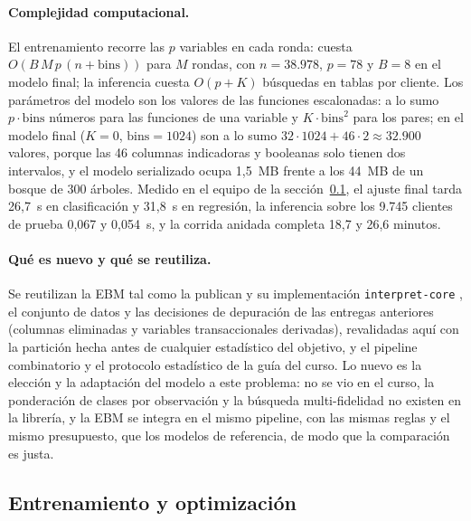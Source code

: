 \paragraph{Complejidad computacional.}
El entrenamiento recorre las $p$ variables en cada ronda: cuesta $O(B\, M\, p\, (n + \mathrm{bins}))$ para
$M$ rondas, con $n = 38.978$, $p = 78$ y $B = 8$ en el modelo final; la inferencia cuesta $O(p + K)$
búsquedas en tablas por cliente. Los parámetros del modelo son los valores de las funciones escalonadas: a
lo sumo $p \cdot \mathrm{bins}$ números para las funciones de una variable y $K \cdot \mathrm{bins}^2$ para
los pares; en el modelo final ($K = 0$, $\mathrm{bins} = 1024$) son a lo sumo $32 \cdot 1024 + 46 \cdot 2 \approx
32.900$ valores, porque las 46 columnas indicadoras y booleanas solo tienen dos intervalos, y el modelo
serializado ocupa 1,5~MB frente a los 44~MB de un bosque de 300 árboles. Medido en el equipo de la sección~\ref{sec:entrenamiento},
el ajuste final tarda 26,7~s en clasificación y 31,8~s en regresión, la inferencia sobre los 9.745 clientes
de prueba 0,067 y 0,054~s, y la corrida anidada completa 18,7 y 26,6 minutos.

\paragraph{Qué es nuevo y qué se reutiliza.}
Se reutilizan la EBM tal como la publican \citet{lou2013ga2m} y su implementación \texttt{interpret-core}
\citep{nori2019interpretml}, el conjunto de datos y las decisiones de depuración de las entregas anteriores
(columnas eliminadas y variables transaccionales derivadas), revalidadas aquí con la partición hecha antes de
cualquier estadístico del objetivo, y el pipeline combinatorio y el protocolo estadístico de la guía del curso. Lo nuevo es la
elección y la adaptación del modelo a este problema: no se vio en el curso, la ponderación de clases por
observación y la búsqueda multi-fidelidad no existen en la librería, y la EBM se integra en el mismo
pipeline, con las mismas reglas y el mismo presupuesto, que los modelos de referencia, de modo que la
comparación es justa.

\subsection{Entrenamiento y optimización}
\label{sec:entrenamiento}

